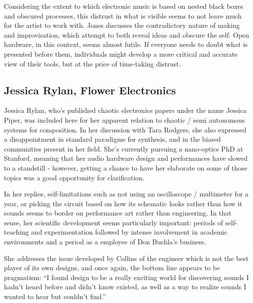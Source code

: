 Considering the extent to which electronic music is based on nested black boxes and obscured processes, this distrust in what is visible seems to not leave much for the artist to work with. Jones discusses the contradictory nature of making and improvisation, which attempt to both reveal ideas and obscure the self. Open hardware, in this context, seems almost futile. If everyone needs to doubt what is presented before them, individuals might develop a more critical and accurate view of their tools, but at the price of time-taking distrust. 


\subsection{Jessica Rylan, Flower Electronics}

Jessica Rylan, who's published chaotic electronics papers under the name Jessica Piper, was included here for her apparent relation to chaotic / semi autonomous systems for composition. In her discussion with Tara Rodgers, she also expressed a disappointment in standard paradigms for synthesis, and in the biased communities present in her field. She's currently pursuing a nano-optics PhD at Stanford, meaning that her audio hardware design and performances have slowed to a standstill - however, getting a chance to have her elaborate on some of those topics was a good opportunity for clarification. 

In her replies, self-limitations such as not using an oscilloscope / multimeter for a year, or picking the circuit based on how its schematic looks rather than how it sounds seems to border on performance art rather than engineering. In that sense, her scientific development seems particularly important: periods of self-teaching and experimentation followed by intense involvement in academic environments and a period as a employee of Don Buchla's business. 

She addresses the issue developed by Collins of the engineer which is not the best player of its own designs, and once again, the bottom line appears to be pragmatism: ``I found design to be a really exciting world for discovering sounds I hadn't heard before and didn't know existed, as well as a way to realize sounds I wanted to hear but couldn't find.''

